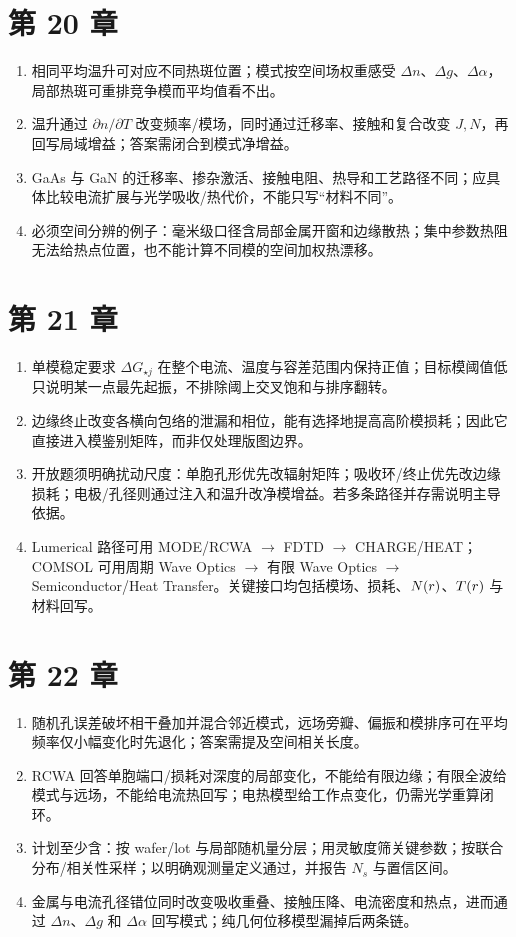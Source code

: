\section{第 20 章}
\begin{enumerate}
  \item 相同平均温升可对应不同热斑位置；模式按空间场权重感受 $\Delta n$、$\Delta g$、$\Delta\alpha$，局部热斑可重排竞争模而平均值看不出。
  \item 温升通过 $\partial n/\partial T$ 改变频率/模场，同时通过迁移率、接触和复合改变 $J,N$，再回写局域增益；答案需闭合到模式净增益。
  \item GaAs 与 GaN 的迁移率、掺杂激活、接触电阻、热导和工艺路径不同；应具体比较电流扩展与光学吸收/热代价，不能只写“材料不同”。
  \item 必须空间分辨的例子：毫米级口径含局部金属开窗和边缘散热；集中参数热阻无法给热点位置，也不能计算不同模的空间加权热漂移。
\end{enumerate}

\section{第 21 章}
\begin{enumerate}
  \item 单模稳定要求 $\Delta G_{\star j}$ 在整个电流、温度与容差范围内保持正值；目标模阈值低只说明某一点最先起振，不排除阈上交叉饱和与排序翻转。
  \item 边缘终止改变各横向包络的泄漏和相位，能有选择地提高高阶模损耗；因此它直接进入模鉴别矩阵，而非仅处理版图边界。
  \item 开放题须明确扰动尺度：单胞孔形优先改辐射矩阵；吸收环/终止优先改边缘损耗；电极/孔径则通过注入和温升改净模增益。若多条路径并存需说明主导依据。
  \item Lumerical 路径可用 MODE/RCWA $\to$ FDTD $\to$ CHARGE/HEAT；COMSOL 可用周期 Wave Optics $\to$ 有限 Wave Optics $\to$ Semiconductor/Heat Transfer。关键接口均包括模场、损耗、$N(r)$、$T(r)$ 与材料回写。
\end{enumerate}

\section{第 22 章}
\begin{enumerate}
  \item 随机孔误差破坏相干叠加并混合邻近模式，远场旁瓣、偏振和模排序可在平均频率仅小幅变化时先退化；答案需提及空间相关长度。
  \item RCWA 回答单胞端口/损耗对深度的局部变化，不能给有限边缘；有限全波给模式与远场，不能给电流热回写；电热模型给工作点变化，仍需光学重算闭环。
  \item 计划至少含：按 wafer/lot 与局部随机量分层；用灵敏度筛关键参数；按联合分布/相关性采样；以明确观测量定义通过，并报告 $N_s$ 与置信区间。
  \item 金属与电流孔径错位同时改变吸收重叠、接触压降、电流密度和热点，进而通过 $\Delta n$、$\Delta g$ 和 $\Delta\alpha$ 回写模式；纯几何位移模型漏掉后两条链。
\end{enumerate}

